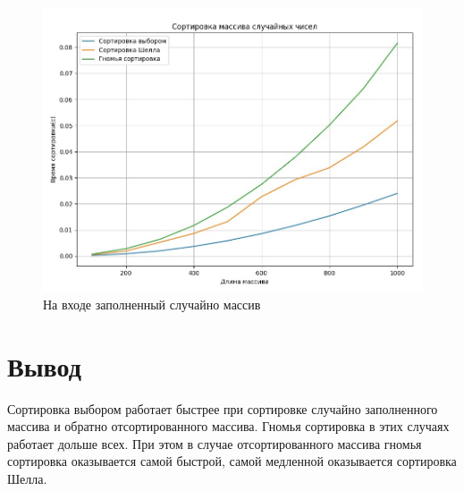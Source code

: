 \begin{figure}[H]
	\begin{center}
		\includegraphics[scale=0.4]{img/random-type.jpg}
	\end{center}
	\captionsetup{justification=centering}
	\caption{На входе заполненный случайно массив}
	\label{img:random-type}
\end{figure}

\section*{Вывод}

Сортировка выбором работает быстрее при сортировке случайно заполненного массива и обратно отсортированного массива. Гномья сортировка в этих случаях работает дольше всех. При этом в случае отсортированного массива гномья сортировка оказывается самой быстрой, самой медленной оказывается сортировка Шелла.